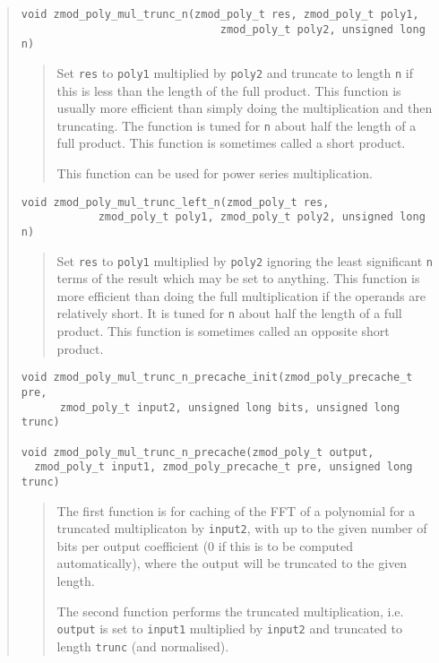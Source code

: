 \documentclass[a4paper,10pt]{article}
\newcommand{\code}{\lstinline}
\begin{document}
\begin{quote}
\begin{lstlisting}
void zmod_poly_mul_trunc_n(zmod_poly_t res, zmod_poly_t poly1, 
                               zmod_poly_t poly2, unsigned long n)
\end{lstlisting}
\begin{quote}
Set \code{res} to \code{poly1} multiplied by \code{poly2} and truncate to length \code{n} if this is less than the length of the full product. This function is usually more efficient than simply doing the multiplication and then truncating. The function is tuned for \code{n} about half the length of a full product. This function is sometimes called a short product.

This function can be used for power series multiplication.
\end{quote}

\begin{lstlisting}
void zmod_poly_mul_trunc_left_n(zmod_poly_t res, 
            zmod_poly_t poly1, zmod_poly_t poly2, unsigned long n)
\end{lstlisting}
\begin{quote}
Set \code{res} to \code{poly1} multiplied by \code{poly2} ignoring the least significant \code{n} terms of the result which may be set to anything. This function is more efficient than doing the full multiplication if the operands are relatively short. It is tuned for \code{n} about half the length of a full product. This function is sometimes called an opposite short product. 
\end{quote}

\begin{lstlisting}
void zmod_poly_mul_trunc_n_precache_init(zmod_poly_precache_t pre,
      zmod_poly_t input2, unsigned long bits, unsigned long trunc)

void zmod_poly_mul_trunc_n_precache(zmod_poly_t output,
  zmod_poly_t input1, zmod_poly_precache_t pre, unsigned long trunc)

\end{lstlisting}
\begin{quote}
The first function is for caching of the FFT of a polynomial for a truncated multiplicaton by \code{input2}, with up to the given number of bits per output coefficient (0 if this is to be computed automatically), where the output will be truncated to the given length.  

The second function performs the truncated multiplication, i.e. \code{output} is set to \code{input1} multiplied by \code{input2} and truncated to length \code{trunc} (and normalised). 


\end{quote}
\end{quote}
\end{document}
